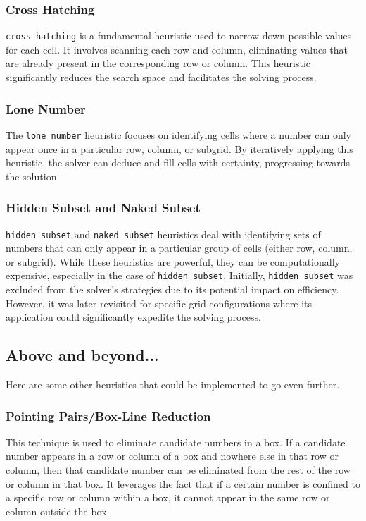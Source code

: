 \documentclass[a4paper, 11pt]{article}
\begin{document}
\subsubsection{Cross Hatching}
\texttt{cross hatching} is a fundamental heuristic used to narrow down possible values for each cell. It involves scanning each row and column, eliminating values that are already present in the corresponding row or column. This heuristic significantly reduces the search space and facilitates the solving process.

\subsubsection{Lone Number}
The \texttt{lone number} heuristic focuses on identifying cells where a number can only appear once in a particular row, column, or subgrid. By iteratively applying this heuristic, the solver can deduce and fill cells with certainty, progressing towards the solution.

\subsubsection{Hidden Subset and Naked Subset}
\texttt{hidden subset} and \texttt{naked subset} heuristics deal with identifying sets of numbers that can only appear in a particular group of cells (either row, column, or subgrid). While these heuristics are powerful, they can be computationally expensive, especially in the case of \texttt{hidden subset}. Initially, \texttt{hidden subset} was excluded from the solver's strategies due to its potential impact on efficiency. However, it was later revisited for specific grid configurations where its application could significantly expedite the solving process.

\subsection{Above and beyond...}
Here are some other heuristics that could be implemented to go even further.
\subsubsection{Pointing Pairs/Box-Line Reduction}
This technique is used to eliminate candidate numbers in a box. If a candidate number appears in a row or column of a box and nowhere else in that row or column, then that candidate number can be eliminated from the rest of the row or column in that box. It leverages the fact that if a certain number is confined to a specific row or column within a box, it cannot appear in the same row or column outside the box.
\end{document}
